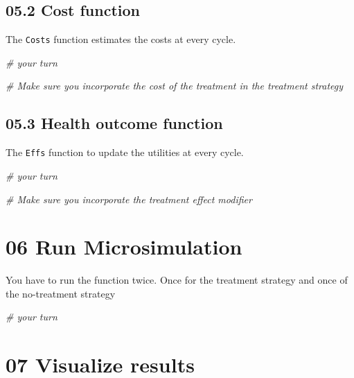 \documentclass[
]{article}
\newenvironment{Shaded}{\begin{snugshade}}{\end{snugshade}}
\newcommand{\CommentTok}[1]{\textcolor[rgb]{0.56,0.35,0.01}{\textit{#1}}}
\begin{document}
\hypertarget{cost-function}{%
\subsection{05.2 Cost function}\label{cost-function}}

The \texttt{Costs} function estimates the costs at every cycle.

\begin{Shaded}
\begin{Highlighting}[]
\CommentTok{# your turn}

\CommentTok{# Make sure you incorporate the cost of the treatment in the treatment strategy}
\end{Highlighting}
\end{Shaded}

\hypertarget{health-outcome-function}{%
\subsection{05.3 Health outcome
function}\label{health-outcome-function}}

The \texttt{Effs} function to update the utilities at every cycle.

\begin{Shaded}
\begin{Highlighting}[]
\CommentTok{# your turn}

\CommentTok{# Make sure you incorporate the treatment effect modifier }
\end{Highlighting}
\end{Shaded}

\hypertarget{run-microsimulation}{%
\section{06 Run Microsimulation}\label{run-microsimulation}}

You have to run the function twice. Once for the treatment strategy and
once of the no-treatment strategy

\begin{Shaded}
\begin{Highlighting}[]
\CommentTok{# your turn}
\end{Highlighting}
\end{Shaded}

\hypertarget{visualize-results}{%
\section{07 Visualize results}\label{visualize-results}}
\end{document}
